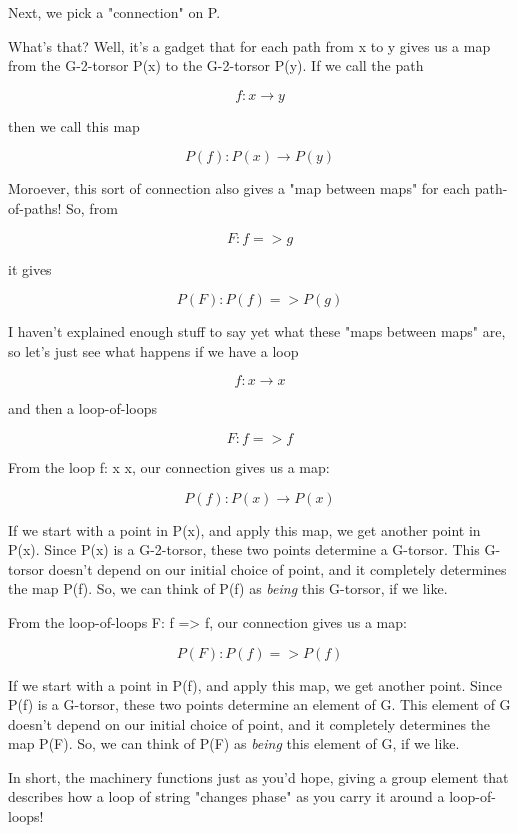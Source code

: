 Next, we pick a "connection" on P.  

What's that?  Well, it's a gadget that for each path from x to y
gives us a map from the G-2-torsor P(x) to the G-2-torsor P(y).
If we call the path


$$

f: x \to  y
$$
    
then we call this map


$$

P(f): P(x) \to  P(y)
$$
    

Moroever, this sort of connection also gives a "map between
maps" for each path-of-paths!  So, from


$$

F: f => g
$$
    
it gives


$$

P(F): P(f) => P(g)
$$
    
I haven't explained enough stuff to say yet what these "maps between
maps" are, so let's just see what happens if we have a loop 


$$

f: x \to  x
$$
    
and then a loop-of-loops 


$$

F: f => f
$$
    
From the loop f: x \to  x, our connection gives us a map:


$$

P(f): P(x) \to  P(x)
$$
    
If we start with a point in P(x), and apply this map, we get another 
point in P(x).  Since P(x) is a G-2-torsor, these two points determine a 
G-torsor.  This G-torsor doesn't depend on our initial choice of 
point, and it completely determines the map P(f).   So, we can think 
of P(f) as \emph{being} this G-torsor, if we like.

From the loop-of-loops F: f => f, our connection gives us a map:


$$

P(F): P(f) => P(f)
$$
    
If we start with a point in P(f), and apply this map, we get 
another point.  Since P(f) is a G-torsor, these two points determine an 
element of G.  This element of G doesn't depend on our initial choice 
of point, and it completely determines the map P(F).   So, 
we can think of P(F) as \emph{being} this element of G, if we like.

In short, the machinery functions just as you'd hope, giving a group
element that describes how a loop of string "changes phase"
as you carry it around a loop-of-loops!

